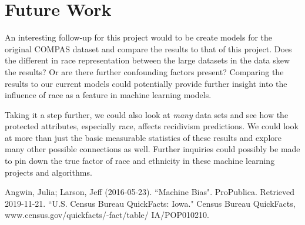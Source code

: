\documentclass[11pt, sigconf]{acmart}
\begin{document}
\section{Future Work}

\hspace{5mm}An interesting follow-up for this project would to be create models for the original COMPAS dataset and compare the results to that of this project. Does the different in race representation between the large datasets in the data skew the results? Or are there further confounding factors present? Comparing the results to our current models could potentially provide further insight into the influence of race as a feature in machine learning models. 

Taking it a step further, we could also look at \emph{many} data sets and see how the protected attributes, especially race, affects recidivism predictions. We could look at more than just the basic measurable statistics of these results and explore many other possible connections as well. Further inquiries could possibly be made to pin down the true factor of race and ethnicity in these machine learning projects and algorithms. 



\begin{thebibliography}{1}

Angwin, Julia; Larson, Jeff (2016-05-23). ``Machine Bias". ProPublica. Retrieved 2019-11-21.
``U.S. Census Bureau QuickFacts: Iowa." Census Bureau QuickFacts, www.census.gov/quickfacts/-fact/table/
IA/POP010210.

\end{thebibliography}
\end{document}
